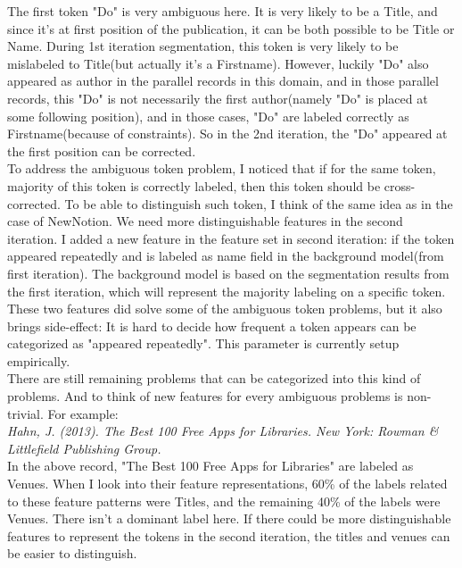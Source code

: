 \documentclass[11pt]{article}
\begin{document}
The first token "Do" is very ambiguous here. It is very likely to be a Title, and since it's at first position of the publication, it can be both possible to be Title or Name. During 1st iteration segmentation, this token is very likely to be mislabeled to Title(but actually it's a Firstname). However, luckily "Do" also appeared as author in the parallel records in this domain, and in those parallel records, this "Do" is not necessarily the first author(namely "Do" is placed at some following position), and in those cases, "Do" are labeled correctly as Firstname(because of constraints). So in the 2nd iteration, the "Do" appeared at the first position can be corrected. \\

To address the ambiguous token problem, I noticed that if for the same token, majority of this token is correctly labeled, then this token should be cross-corrected. To be able to distinguish such token, I think of the same idea as in the case of NewNotion. We need more distinguishable features in the second iteration. I added a new feature in the feature set in second iteration: if the token appeared repeatedly and is labeled as name field in the background model(from first iteration). The background model is based on the segmentation results from the first iteration, which will represent the majority labeling on a specific token. These two features did solve some of the ambiguous token problems, but it also brings side-effect: It is hard to decide how frequent a token appears can be categorized as "appeared repeatedly". This parameter is currently setup empirically.\\

There are still remaining problems that can be categorized into this kind of problems. And to think of new features for every ambiguous problems is non-trivial. For example: \\

\textit{Hahn, J. (2013). The Best 100 Free Apps for Libraries. New York: Rowman \& Littlefield Publishing Group.}\\

In the above record, "The Best 100 Free Apps for Libraries" are labeled as Venues. When I look into their feature representations, 60\% of the labels related to these feature patterns were Titles, and the remaining 40\% of the labels were Venues. There isn't a dominant label here. If there could be more distinguishable features to represent the tokens in the second iteration, the titles and venues can be easier to distinguish. \\
\end{document}

